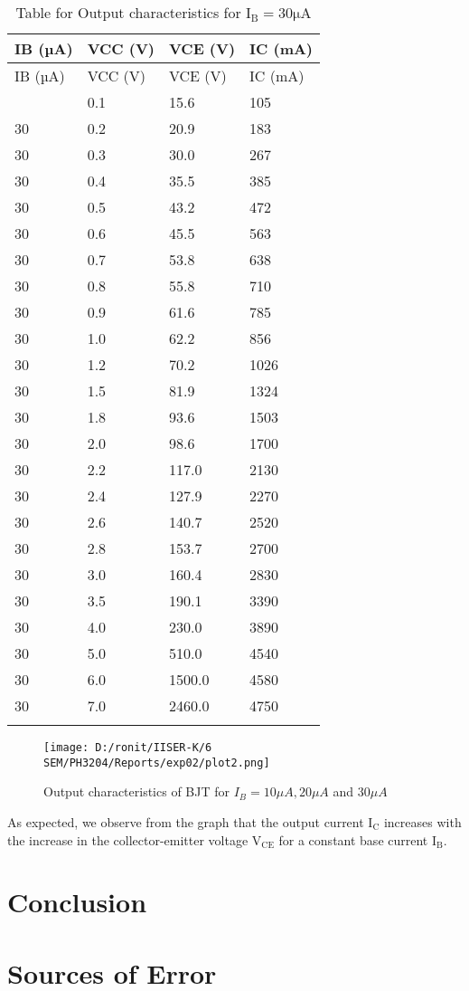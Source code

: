 \documentclass[12pt]{article}
\begin{document}
\begin{longtable}{|l|l|l|l|}
	\hline
    IB (µA) & VCC (V) & VCE (V) & IC (mA) \\ \hline
	\endfirsthead
	\hline
    IB (µA) & VCC (V) & VCE (V) & IC (mA) \\ \hline
	\endhead
	\hline
	\endfoot
	\endlastfoot
    30  & 0.1  & 15.6  & 105  \\ \hline
    30  & 0.2  & 20.9  & 183  \\ \hline
    30  & 0.3  & 30.0  & 267  \\ \hline
    30  & 0.4  & 35.5  & 385  \\ \hline
    30  & 0.5  & 43.2  & 472  \\ \hline
    30  & 0.6  & 45.5  & 563  \\ \hline
    30  & 0.7  & 53.8  & 638  \\ \hline
    30  & 0.8  & 55.8  & 710  \\ \hline
    30  & 0.9  & 61.6  & 785  \\ \hline
    30  & 1.0  & 62.2  & 856  \\ \hline
    30  & 1.2  & 70.2  & 1026 \\ \hline
    30  & 1.5  & 81.9  & 1324 \\ \hline
    30  & 1.8  & 93.6  & 1503 \\ \hline
    30  & 2.0  & 98.6  & 1700 \\ \hline
    30  & 2.2  & 117.0 & 2130 \\ \hline
    30  & 2.4  & 127.9 & 2270 \\ \hline
    30  & 2.6  & 140.7 & 2520 \\ \hline
    30  & 2.8  & 153.7 & 2700 \\ \hline
    30  & 3.0  & 160.4 & 2830 \\ \hline
    30  & 3.5  & 190.1 & 3390 \\ \hline
    30  & 4.0  & 230.0 & 3890 \\ \hline
    30  & 5.0  & 510.0 & 4540 \\ \hline
    30  & 6.0  & 1500.0 & 4580 \\ \hline
    30  & 7.0  & 2460.0 & 4750 \\ \hline
\caption{Table for Output characteristics for $\mathrm{I_B=30 \mu A}$}
\end{longtable}
\begin{figure}[H]  
    \centering  
    \texttt{[image: D:/ronit/IISER-K/6 SEM/PH3204/Reports/exp02/plot2.png]}  %
    \caption{Output characteristics of BJT for $I_{B}=10\mu A,20\mu A$ and $30\mu A$}  %
    \label{fig:part01_02}  %
  \end{figure}\noindent
As expected, we observe from the graph that the output current $\mathrm{I_C}$ increases with the increase in the collector-emitter voltage $\mathrm{V_{CE}}$ for a constant base current $\mathrm{I_B}$.
\section{Conclusion}
\section{Sources of Error}

 
\end{document}
